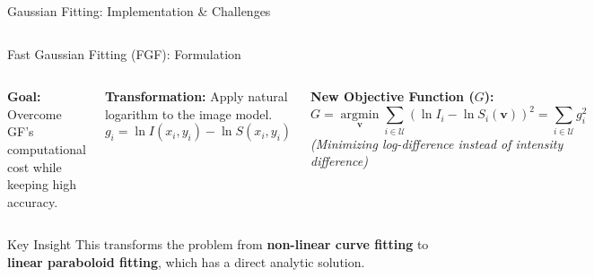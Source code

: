 \begin{frame}{Gaussian Fitting: Implementation \& Challenges}
\begin{columns}
        
        \vspace{0.3cm}
    \end{columns}
\end{frame}


\begin{frame}{Fast Gaussian Fitting (FGF): Formulation}
    \begin{columns}
        \textbf{Goal:} Overcome GF's computational cost while keeping high accuracy.
        
        \vspace{0.3cm}
        \textbf{Transformation:} Apply natural logarithm to the image model.
        \[
            g_i = \ln I(x_i, y_i) - \ln S(x_i, y_i)
        \]
        
        \textbf{New Objective Function ($G$):}
        \[
            G = \operatorname*{argmin}_{\mathbf{v}} \sum_{i \in \mathcal{U}} \left( \ln I_i - \ln S_i(\mathbf{v}) \right)^2 = \sum_{i \in \mathcal{U}} g_i^2
        \]
        \small \textit{(Minimizing log-difference instead of intensity difference)}
        
        \centering
    \end{columns}
    
    \vspace{0.2cm}
    \begin{alertblock}{Key Insight}
        This transforms the problem from \textbf{non-linear curve fitting} to \textbf{linear paraboloid fitting}, which has a direct analytic solution.
    \end{alertblock}
\end{frame}

